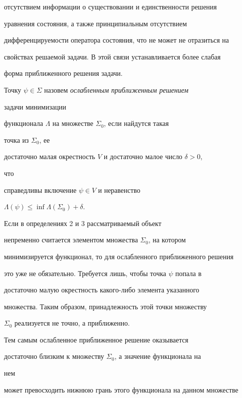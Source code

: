 отсутствием информации о существовании и единственности решения 


уравнения состояния, а также принципиальным отсутствием 


дифференцируемости оператора состояния, что не может не отразиться на 


свойствах решаемой задачи. В этой связи устанавливается более слабая 


форма приближенного решения задачи. 


 


\begin{defn} 


Точку $\psi\in\Sigma$ назовем {\it ослабленным приближенным решением} 


задачи минимизации 


функционала $\Lambda$ на множестве $\Sigma_0$, если найдутся такая 


точка из $\Sigma_0$, ее 


достаточно малая окрестность $V$ и достаточно малое число $\delta>0$, 


что 


справедливы включение $\psi\in V$ и неравенство 


$\Lambda(\psi)\le\inf\Lambda(\Sigma_0)+\delta$. 


\end{defn} 


 


Если в определениях 2 и 3 рассматриваемый объект 


непременно считается элементом множества $\Sigma_0$, на котором 


минимизируется функционал, то для ослабленного приближенного решения 


это уже не обязательно. Требуется лишь, чтобы точка $\psi$ попала в 


достаточно малую окрестность какого-либо элемента указанного 


множества. Таким образом, принадлежность этой точки множеству 


$\Sigma_0$ реализуется не точно, а приближенно.


Тем самым ослабленное приближенное решение оказывается 


достаточно близким к множеству $\Sigma_0$, а значение функционала на 


нем 


может превосходить нижнюю грань этого функционала на данном множестве 


